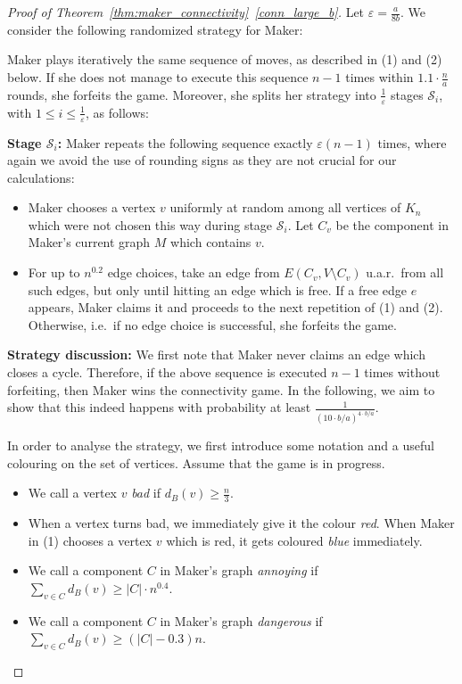 \documentclass[11pt, a4paper]{article}
\numberwithin{equation}{section}
\numberwithin{figure}{section}
\begin{document}
\begin{proof}[Proof of Theorem~\ref{thm:maker_connectivity}~\ref{conn_large_b}]
Let $\varepsilon = \frac{a}{8b}$.
We consider the following randomized strategy for Maker:

Maker plays iteratively the same sequence of moves, as described in (1) and (2) below. If she does not manage to execute this sequence $n-1$ times within $1.1\cdot \frac{n}{a}$ rounds, she forfeits the game. 
Moreover, she splits her strategy into $\frac{1}{\varepsilon}$ stages $\mathcal{S}_i$, with $1\leq i\leq \frac{1}{\varepsilon}$, as follows:

\smallskip

\textbf{Stage $\mathcal{S}_i$:} 
Maker repeats the following sequence exactly
$\varepsilon(n-1)$ times, where again we avoid the use of rounding signs as they are not crucial for our calculations:

\begin{itemize}
\item[(1)] Maker chooses a vertex $v$ uniformly at random among all vertices of $K_n$ which were not chosen this way during 
stage $\mathcal{S}_i$. 
Let $C_v$ be the component in Maker's current graph $M$ which contains $v$.
\item[(2)] For up to $n^{0.2}$ edge choices, take an edge from
$E(C_v,V\setminus C_v)$ u.a.r.~from all such edges, but only until hitting an edge which is free.
If a free edge $e$ appears,
Maker claims it and proceeds to the next repetition of (1) and (2). Otherwise, i.e.~if no edge choice is successful, she forfeits the game.
\end{itemize}

\medskip

\textbf{Strategy discussion:}
We first note that Maker never claims an edge which closes a cycle.
Therefore, if the above sequence is executed $n-1$ times without forfeiting, then Maker wins the connectivity game. In the following, we aim to show 
that this indeed happens
with probability at least $\frac{1}{(10\cdot b/a)^{4\cdot b/a}}$.

\medskip

In order to analyse the strategy, we first introduce some notation and a useful colouring on the set of vertices. Assume that the game is in progress.
\begin{itemize}
\item We call a vertex $v$ \textit{bad} if $d_B(v)\geq \frac{n}{3}$.
\item When a vertex turns bad, we immediately give it the colour \textit{red}. When Maker in (1) chooses a vertex $v$ which is red, it gets coloured \textit{blue} immediately. 
\item We call a component $C$ in Maker's graph 
\textit{annoying} if
$\sum_{v\in C} d_B(v) \geq |C|\cdot n^{0.4}$.
\item We call a component $C$ in Maker's graph \textit{dangerous} if
$\sum_{v\in C} d_B(v) \geq (|C|-0.3) n$.
\end{itemize}


\end{proof}
\end{document}
